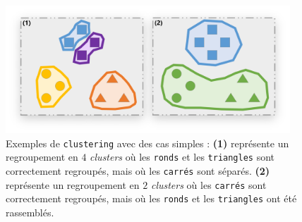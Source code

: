 		\newpage
		\begin{figure}[H]
			\centering
			\includegraphics[width=0.95\textwidth]{figures/annexe-vmeasure-cas-simples}
			\caption{
				Exemples de \texttt{clustering} avec des cas simples :
				\textbf{(1)} représente un regroupement en $4$ \textit{clusters} où les \texttt{ronds} et les \texttt{triangles} sont correctement regroupés, mais où les \texttt{carrés} sont séparés.
				\textbf{(2)} représente un regroupement en $2$ \textit{clusters} où les \texttt{carrés} sont correctement regroupés, mais où les \texttt{ronds} et les \texttt{triangles} ont été rassemblés.
			}
			\label{figure:D.2-ANNEXE-EVALUATION-CLUSTERING-EXEMPLE-VMEASURE-2-CAS-SIMPLES}
		\end{figure}
		
